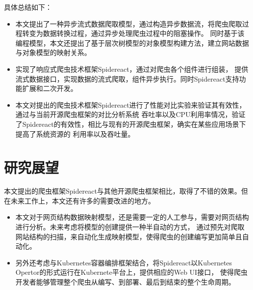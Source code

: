 \documentclass[master]{njuthesis}
\begin{document}
具体总结如下：

\begin{itemize}




\item 本文提出了一种异步流式数据爬取模型，通过构造异步数据流，将爬虫爬取过程转变为数据转换过程，通过异步处理爬虫过程中的阻塞操作。
同时基于该编程模型，本文还提出了基于层次树模型的对象模型构建方法，建立网站数据与对象模型的映射关系。

\item 实现了响应式爬虫技术框架Spidereact，通过对爬虫各个组件进行组装，
提供流式数据接口，实现数据的流式爬取，组件异步执行。同时Spidereact支持功能扩展和二次开发。
\item 本文对提出的爬虫技术框架Spidereact进行了性能对比实验来验证其有效性，通过与当前开源爬虫框架的对比分析系统
吞吐率以及CPU利用率情况，验证了Spidereact的有效性，相比与现有的开源爬虫框架，确实在某些应用场景下提高了系统资源的
利用率以及吞吐量。 
\end{itemize}


\section{研究展望}
本文提出的爬虫框架Spidereact与其他开源爬虫框架相比，取得了不错的效果。但在未来工作上，本文还有许多的需要改进的地方。
\begin{itemize}

\item 本文对于网页结构数据映射模型，还是需要一定的人工参与，需要对网页结构进行分析。未来考虑将模型的创建提供一种半自动的方式，
通过预先对爬取网站结构的扫描，来自动化生成映射模型，使得爬虫的创建编写更加简单且自动化。

\item 另外还考虑与Kubernetes容器编排框架结合，将Spidereact以Kubernetes Opertor的形式运行在Kubernete平台上，提供相应的Web UI接口，
使得爬虫开发者能够管理整个爬虫从编写、到部署、最后到结束的整个生命周期。

\end{itemize}
\end{document}
